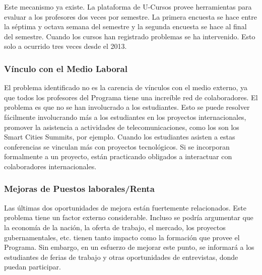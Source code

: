 Este mecanismo ya existe. La plataforma de U-Cursos provee herramientas para evaluar a los profesores dos veces por semestre. La primera encuesta se hace entre la séptima y octava semana del semestre y la segunda encuesta se hace al final del semestre. Cuando los cursos han registrado problemas se ha intervenido. Esto solo a ocurrido tres veces desde el 2013.

\subsubsection{Vínculo con el Medio Laboral}

El problema identificado no es la carencia de vínculos con el medio externo, ya que todos los profesores 
del Programa tiene una increíble red de colaboradores. El problema es que no se han involucrado a los estudiantes.
Esto se puede resolver fácilmente involucrando más a los estudiantes en los proyectos internacionales, promover la asistencia a actividades 
de telecomunicaciones, como los son los Smart Cities Summits, por ejemplo. Cuando los estudiantes asisten a estas conferencias se vinculan más con
proyectos tecnológicos. Si se incorporan formalmente a un proyecto, están practicando obligados a interactuar con colaboradores internacionales.

\subsubsection{Mejoras de Puestos laborales/Renta}

Las últimas dos oportunidades de mejora están fuertemente relacionados. Este problema tiene un factor externo considerable. Incluso se podría argumentar que la economía de la nación, la oferta de trabajo, el mercado, los proyectos gubernamentales, etc. tienen tanto impacto como la formación
que provee el Programa. 
Sin embargo, en un esfuerzo de mejorar este punto, se informará a los estudiantes de ferias de trabajo y otras oportunidades de entrevistas, donde
puedan participar.


















